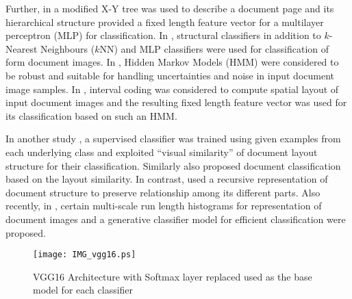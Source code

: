\documentclass[10pt,conference,a4paper]{IEEEtran}
\begin{document}
Further, in \cite{cesarini2001} a modified X-Y tree was used to describe a document page and its hierarchical structure provided a fixed length feature vector for a multilayer perceptron (MLP) for classification. In \cite{heroux1998}, structural classifiers in addition to $k$-Nearest Neighbours ($k$NN) and MLP classifiers were used for classification of form document images. In \cite{rabiner1990}, Hidden Markov Models (HMM) were considered to be robust and suitable for handling uncertainties and noise in input document image samples. In \cite{hu2000}, interval coding was considered to compute spatial layout of input document images and the resulting fixed length feature vector was used for its classification based on such an HMM.

In another study \cite{shin2001}, a supervised classifier was trained using  given examples from each underlying class and exploited “visual similarity” of document layout structure for their classification. Similarly \cite{hu2000} also proposed document classification based on the layout similarity. In contrast, \cite{diligenti2003} used a recursive representation of document structure to preserve relationship among its different parts. Also recently, in \cite{gordo2013}, certain multi-scale run length histograms for representation of document images and a generative classifier model for efficient classification were proposed.


\begin{figure}[t]
	\centering
	\texttt{[image: IMG\_vgg16.ps]}
	\caption{VGG16 Architecture with Softmax layer replaced used as the base model for each classifier} \label{fig:DCNNarch}
\end{figure}
\end{document}
